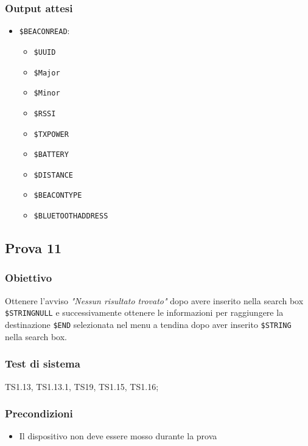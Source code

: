 \documentclass[../Sperimentazione.tex]{subfiles}
\begin{document}
	\subsubsection{Output attesi}
		\begin{itemize}
		\item \verb|$BEACONREAD|:
			\begin{itemize}
				\item \verb|$UUID|
			 	\item \verb|$Major|
			 	\item \verb|$Minor|
			 	\item \verb|$RSSI|
			 	\item \verb|$TXPOWER|
			 	\item \verb|$BATTERY|
			 	\item \verb|$DISTANCE|
			 	\item \verb|$BEACONTYPE|
			 	\item \verb|$BLUETOOTHADDRESS|
			\end{itemize}
			 
		\end{itemize}
		


\newpage	
\subsection{Prova 11} %
\label{subsec:Prova11}
	
	\subsubsection{Obiettivo}
		Ottenere l'avviso \textit{"Nessun risultato trovato"} dopo avere inserito nella search box  \verb|$STRINGNULL| e successivamente ottenere le informazioni per raggiungere la destinazione  \verb|$END| selezionata nel menu a tendina dopo aver inserito  \verb|$STRING| nella search box.
		
	\subsubsection{Test di sistema}
		TS1.13, TS1.13.1,
		TS19,
		TS1.15, TS1.16;
		
	\subsubsection{Precondizioni}
		\begin{itemize}
			\item Il dispositivo non deve essere mosso durante la prova
		\end{itemize}
		
\end{document}
